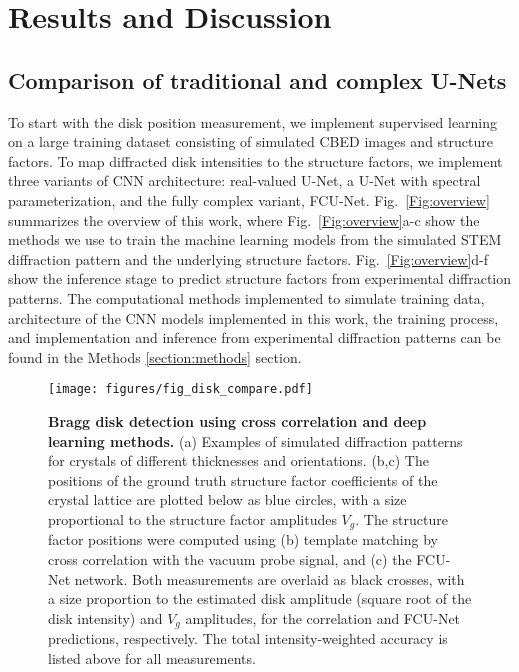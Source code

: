 \documentclass[%
 reprint,
superscriptaddress,
 amsmath,
 amssymb,
 prl,
]{revtex4-2}
\begin{document}
\section*{Results and Discussion}
\label{section:results}


\subsection*{Comparison of traditional and complex U-Nets}

To start with the disk position measurement, we implement supervised learning on a large training dataset consisting of simulated CBED images and structure factors. To map diffracted disk intensities to the structure factors, we implement three variants of CNN architecture: real-valued U-Net, a U-Net with spectral parameterization, and the fully complex variant, FCU-Net. Fig.~\ref{Fig:overview} summarizes the overview of this work, where Fig.~\ref{Fig:overview}a-c show the methods we use to train the machine learning models from the simulated STEM diffraction pattern and the underlying structure factors. Fig.~\ref{Fig:overview}d-f show the inference stage to predict structure factors from experimental diffraction patterns.
 The computational methods implemented to simulate training data, architecture of the CNN models implemented in this work, the training process, and implementation and inference from experimental diffraction patterns can be found in the Methods \ref{section:methods} section.
 
 
\begin{figure*}[htbp]
    \texttt{[image: figures/fig\_disk\_compare.pdf]}
    \caption{{\bf Bragg disk detection using cross correlation and deep learning methods.} (a) Examples of simulated diffraction patterns for crystals of different thicknesses and orientations. (b,c) The positions of the ground truth structure factor coefficients of the crystal lattice are plotted below as blue circles, with a size proportional to the structure factor amplitudes $V_g$. The structure factor positions were computed using (b) template matching by cross correlation with the vacuum probe signal, and (c) the FCU-Net network. Both measurements are overlaid as black crosses, with a size proportion to the estimated disk amplitude (square root of the disk intensity) and $V_g$ amplitudes, for the correlation and FCU-Net predictions, respectively. The total intensity-weighted accuracy is listed above for all measurements.}
    \centering
    \label{Fig:disk_compare}
\end{figure*}
\end{document}
